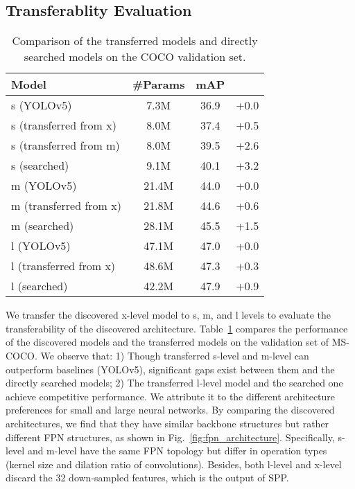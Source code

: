 \documentclass[letterpaper]{article} \usepackage{aaai22}  \usepackage{times}  \usepackage{helvet}  \usepackage{courier}  \usepackage[hyphens]{url}  \usepackage{graphicx} \urlstyle{rm} \def\UrlFont{\rm}  \usepackage{natbib}  \usepackage{caption} \DeclareCaptionStyle{ruled}{labelfont=normalfont,labelsep=colon,strut=off} \frenchspacing  \setlength{\pdfpagewidth}{8.5in}  \setlength{\pdfpageheight}{11in}
\begin{document}
\subsection{Transferablity Evaluation}
\begin{table}[tb]
    \centering
\caption{Comparison of the transferred models and directly searched models on the COCO validation set.}
    \label{tab:transferres}
    \vspace{-8pt}
\begin{tabular}{lccc}
        \toprule
        \textbf{Model}    & \textbf{\#Params} & \textbf{mAP} & \textbf{} \\ \hline
        s (YOLOv5) & 7.3M & 36.9 & +0.0 \\
        s (transferred from x) & 8.0M & 37.4 & +0.5 \\
        s (transferred from m) & 8.0M & 39.5 & +2.6 \\
        s (searched) & 9.1M & 40.1 & +3.2 \\
        \midrule
        m (YOLOv5) & 21.4M & 44.0 & +0.0 \\
        m (transferred from x) & 21.8M & 44.6 & +0.6 \\
        m (searched) & 28.1M & 45.5 & +1.5 \\
        \midrule
        l (YOLOv5) & 47.1M & 47.0 & +0.0 \\
        l (transferred from x) & 48.6M & 47.3 & +0.3 \\
        l (searched) & 42.2M &  47.9 & +0.9 \\
        \bottomrule
        \end{tabular}
\end{table}
We transfer the discovered x-level model to s, m, and l levels to evaluate the transferability of the discovered architecture. Table~\ref{tab:transferres} compares the performance of the discovered models and the transferred models on the validation set of MS-COCO. 
We observe that: 1) Though transferred s-level and m-level can outperform baselines (YOLOv5), significant gaps exist between them and the directly searched models;  2) The transferred l-level model and the searched one achieve competitive performance. We attribute it to the different architecture preferences for small and large neural networks.
By comparing the discovered architectures, we find that they have similar backbone structures but rather different FPN structures, as shown in Fig.~\ref{fig:fpn_architecture}. Specifically, s-level and m-level have the same FPN topology but differ in operation types (kernel size and dilation ratio of convolutions). Besides, both l-level and x-level discard the 32 down-sampled features, which is the output of SPP.
\end{document}
